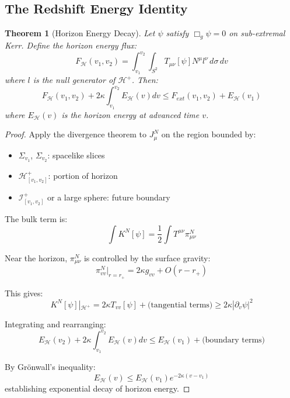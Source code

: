 \documentclass[12pt,a4paper]{article}
\newtheorem{theorem}{Theorem}[section]
\begin{document}
\subsection{The Redshift Energy Identity}

\begin{theorem}[Horizon Energy Decay]\label{thm:horizon-decay}
Let $\psi$ satisfy $\Box_g \psi = 0$ on sub-extremal Kerr. Define the horizon energy flux:
\begin{equation}
F_{\mathcal{H}}(v_1, v_2) = \int_{v_1}^{v_2} \int_{S^2} T_{\mu\nu}[\psi]N^\mu l^\nu\, d\sigma\, dv
\end{equation}
where $l$ is the null generator of $\mathcal{H}^+$. Then:
\begin{equation}
F_{\mathcal{H}}(v_1, v_2) + 2\kappa \int_{v_1}^{v_2} E_{\mathcal{H}}(v) dv \leq F_{ext}(v_1, v_2) + E_{\mathcal{H}}(v_1)
\end{equation}
where $E_{\mathcal{H}}(v)$ is the horizon energy at advanced time $v$.
\end{theorem}

\begin{proof}
Apply the divergence theorem to $J^N_\mu$ on the region bounded by:
\begin{itemize}
    \item $\Sigma_{v_1}$, $\Sigma_{v_2}$: spacelike slices
    \item $\mathcal{H}^+_{[v_1, v_2]}$: portion of horizon
    \item $\mathcal{I}^+_{[v_1, v_2]}$ or a large sphere: future boundary
\end{itemize}

The bulk term is:
\begin{equation}
\int K^N[\psi] = \frac{1}{2}\int T^{\mu\nu}\pi^N_{\mu\nu}
\end{equation}

Near the horizon, $\pi^N_{\mu\nu}$ is controlled by the surface gravity:
\begin{equation}
\pi^N_{vv}|_{r=r_+} = 2\kappa g_{vv} + O(r - r_+)
\end{equation}

This gives:
\begin{equation}
K^N[\psi]|_{\mathcal{H}^+} = 2\kappa T_{vv}[\psi] + \text{(tangential terms)} \geq 2\kappa |\partial_v \psi|^2
\end{equation}

Integrating and rearranging:
\begin{equation}
E_{\mathcal{H}}(v_2) + 2\kappa \int_{v_1}^{v_2} E_{\mathcal{H}}(v) dv \leq E_{\mathcal{H}}(v_1) + \text{(boundary terms)}
\end{equation}

By Grönwall's inequality:
\begin{equation}
E_{\mathcal{H}}(v) \leq E_{\mathcal{H}}(v_1) e^{-2\kappa(v - v_1)}
\end{equation}
establishing exponential decay of horizon energy.
\end{proof}
\end{document}
